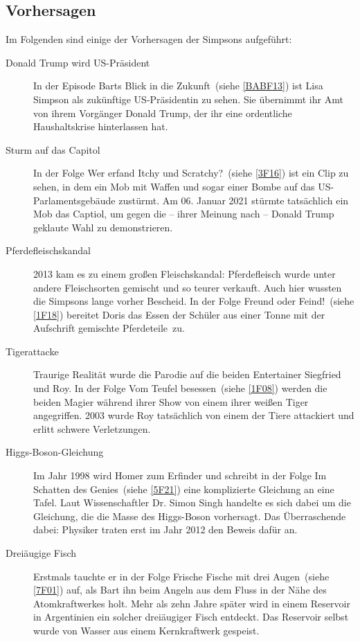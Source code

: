 \begin{appendix}
\section{Vorhersagen}\label{Vorhersagen}
Im Folgenden sind einige der Vorhersagen der Simpsons aufgeführt:

\begin{description}
  \item[Donald Trump wird US-Präsident] In der Episode \glqq Barts Blick in die Zukunft\grqq\ (siehe \ref{BABF13}) ist Lisa Simpson als zukünftige US-Präsidentin zu sehen. Sie übernimmt ihr Amt von ihrem Vorgänger Donald Trump, der ihr eine ordentliche Haushaltskrise hinterlassen hat.
  \item[Sturm auf das Capitol] In der Folge \glqq Wer erfand Itchy und Scratchy?\grqq\ (siehe \ref{3F16}) ist ein Clip zu sehen, in dem ein Mob mit Waffen und sogar einer Bombe auf das US-Par\-la\-ments\-ge\-bäu\-de zustürmt. Am 06. Januar 2021 stürmte tatsächlich ein Mob das Captiol, um gegen die -- ihrer Meinung nach -- Donald Trump geklaute Wahl zu demonstrieren.
  \item[Pferdefleischskandal] 2013 kam es zu einem großen Fleischskandal: Pferdefleisch wurde unter andere Fleischsorten gemischt und so teurer verkauft. Auch hier wussten die Simpsons lange vorher Bescheid. In der Folge \glqq Freund oder Feind!\grqq\ (siehe \ref{1F18}) bereitet Doris das Essen der Schüler aus einer Tonne mit der Aufschrift \glqq gemischte Pferdeteile\grqq\ zu.
  \item[Tigerattacke] Traurige Realität wurde die Parodie auf die beiden Entertainer Siegfried und Roy. In der Folge \glqq Vom Teufel besessen\grqq\ (siehe \ref{1F08}) werden die beiden Magier während ihrer Show von einem ihrer weißen Tiger angegriffen. 2003 wurde Roy tatsächlich von einem der Tiere attackiert und erlitt schwere Verletzungen.
  \item [Higgs-Boson-Gleichung] Im Jahr 1998 wird Homer zum Erfinder und schreibt in der Folge \glqq Im Schatten des Genies\grqq\ (siehe \ref{5F21}) eine komplizierte Gleichung an eine Tafel. Laut Wissenschaftler Dr. Simon Singh handelte es sich dabei um die Gleichung, die die Masse des Higgs-Boson vorhersagt. Das Überraschende dabei: Physiker traten erst im Jahr 2012 den Beweis dafür an.
  \item [Dreiäugige Fisch] Erstmals tauchte er in der Folge \glqq Frische Fische mit drei Augen\grqq\ (siehe \ref{7F01}) auf, als Bart ihn beim Angeln aus dem Fluss in der Nähe des Atomkraftwerkes holt. Mehr als zehn Jahre später wird in einem Reservoir in Argentinien ein solcher dreiäugiger Fisch entdeckt. Das Reservoir selbst wurde von Wasser aus einem Kernkraftwerk gespeist.

\end{description}
\end{appendix}
